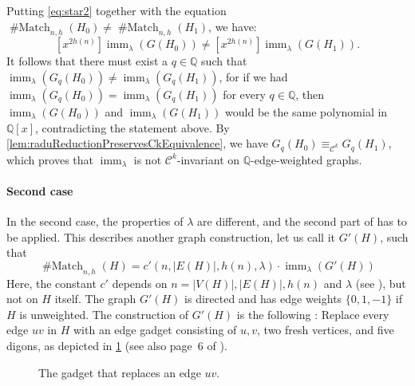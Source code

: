 \documentclass[10pt,a4paper]{article}
\theoremstyle{definition}
\theoremstyle{plain}
\theoremstyle{remark}
\newcommand{\bbQ}{\mathbb{Q}}
\DeclareMathOperator{\imm}{imm}
\DeclareMathOperator{\Match}{\# Match}
\begin{document}
Putting \cref{eq:star2}  together with the equation $\Match_{n,h}(H_0) \neq \Match_{n,h}(H_1)$, we have:
\[
 [x^{2h(n)}] \imm_{\lambda}(G(H_0)) \neq [x^{2h(n)}] \imm_{\lambda}(G(H_1)).
\]
It follows that there must exist a $q \in \bbQ$ such that $\imm_{\lambda}(G_q(H_0)) \neq \imm_{\lambda}(G_q(H_1))$, for if we had $\imm_{\lambda}(G_q(H_0)) = \imm_{\lambda}(G_q(H_1))$ for every $q \in \bbQ$, then $\imm_{\lambda}(G(H_0))$ and $\imm_{\lambda}(G(H_1))$ would be the same polynomial in $\bbQ[x]$, contradicting the statement above. 
By \cref{lem:raduReductionPreservesCkEquivalence}, we have $G_q(H_0) \equiv_{\mathcal{C}^k} G_q(H_1)$, which proves that $\imm_{\lambda}$ is not $\mathcal{C}^k$-invariant on $\bbQ$-edge-weighted graphs. 

\paragraph*{Second case}
In the second case, the properties of $\lambda$ are different, and the second part of \cite[Lemma 28]{curticapean2021full} has to be applied. 
This describes another graph construction, let us call it $G'(H)$, such that
\begin{equation}
\Match_{n,h}(H) = c'(n, |E(H)|, h(n), \lambda) \cdot \imm_{\lambda}(G'(H)) \label{eq:2stars}
\end{equation}
Here, the constant $c'$ depends on $n=|V(H)|, |E(H)|, h(n)$ and $\lambda$ (see \cite[Lemma 28]{curticapean2021complexitydichotomyimmanantfamilies}), but not on $H$ itself.
The graph $G'(H)$ is directed and has edge weights $\{0,1,-1\}$ if $H$ is unweighted.
The construction of $G'(H)$ is the following \cite[Lemma 28]{curticapean2021complexitydichotomyimmanantfamilies}: Replace
every edge $uv$ in $H$ with an edge gadget consisting of $u, v$, two
fresh vertices, and five digons, as depicted in \cref{fig:gadget} (see also page~6 of \cite{curticapean2021complexitydichotomyimmanantfamilies}).
\begin{figure}
\centering
{}
\caption{The gadget that replaces an edge $uv$.\label{fig:gadget}}
\end{figure}
\end{document}
